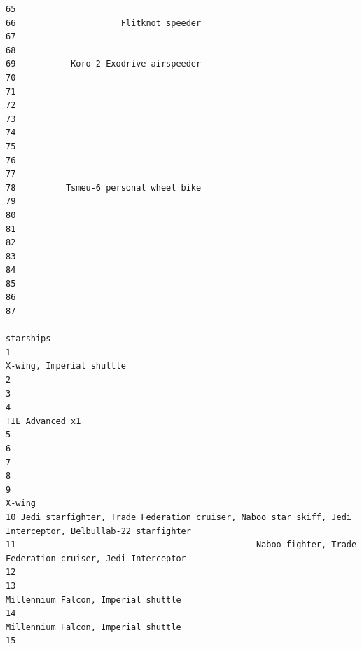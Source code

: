 \documentclass[
]{article}
\begin{document}
\begin{verbatim}
65                                     
66                     Flitknot speeder
67                                     
68                                     
69           Koro-2 Exodrive airspeeder
70                                     
71                                     
72                                     
73                                     
74                                     
75                                     
76                                     
77                                     
78          Tsmeu-6 personal wheel bike
79                                     
80                                     
81                                     
82                                     
83                                     
84                                     
85                                     
86                                     
87                                     
                                                                                                  starships
1                                                                                  X-wing, Imperial shuttle
2                                                                                                          
3                                                                                                          
4                                                                                           TIE Advanced x1
5                                                                                                          
6                                                                                                          
7                                                                                                          
8                                                                                                          
9                                                                                                    X-wing
10 Jedi starfighter, Trade Federation cruiser, Naboo star skiff, Jedi Interceptor, Belbullab-22 starfighter
11                                                Naboo fighter, Trade Federation cruiser, Jedi Interceptor
12                                                                                                         
13                                                                      Millennium Falcon, Imperial shuttle
14                                                                      Millennium Falcon, Imperial shuttle
15                                                                                                         

\end{verbatim}
\end{document}
